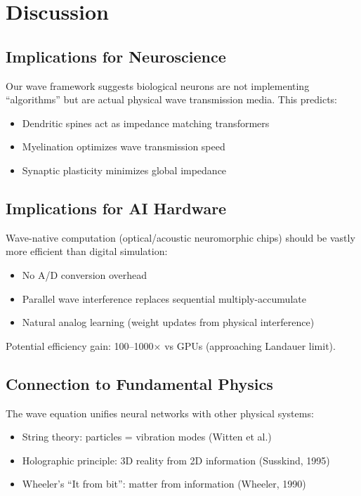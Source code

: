 \documentclass{article}
\begin{document}
\section{Discussion}

\subsection{Implications for Neuroscience}

Our wave framework suggests biological neurons are not implementing ``algorithms'' but are actual physical wave transmission media. This predicts:
\begin{itemize}
\item Dendritic spines act as impedance matching transformers
\item Myelination optimizes wave transmission speed
\item Synaptic plasticity minimizes global impedance
\end{itemize}

\subsection{Implications for AI Hardware}

Wave-native computation (optical/acoustic neuromorphic chips) should be vastly more efficient than digital simulation:
\begin{itemize}
\item No A/D conversion overhead
\item Parallel wave interference replaces sequential multiply-accumulate
\item Natural analog learning (weight updates from physical interference)
\end{itemize}

Potential efficiency gain: 100--1000$\times$ vs GPUs (approaching Landauer limit).

\subsection{Connection to Fundamental Physics}

The wave equation unifies neural networks with other physical systems:
\begin{itemize}
\item String theory: particles = vibration modes (Witten et al.)
\item Holographic principle: 3D reality from 2D information (Susskind, 1995)
\item Wheeler's ``It from bit'': matter from information (Wheeler, 1990)
\end{itemize}
\end{document}
